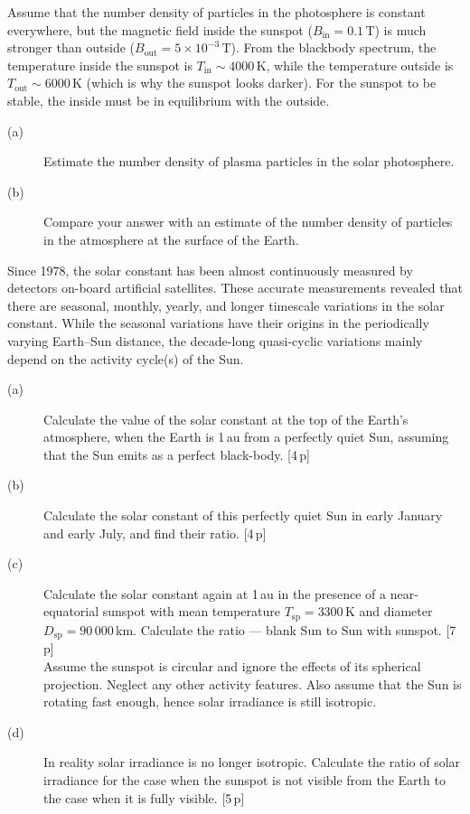 Assume that the number density of particles in the photosphere is constant
everywhere, but the magnetic field inside the sunspot
($B_{\mathrm{in}} = 0.1$\,T) is much stronger than outside
($B_{\mathrm{out}} = 5 \times 10^{-3}$\,T). From the blackbody spectrum, the
temperature inside the sunspot is $T_{\mathrm{in}} \sim 4000$\,K, while the
temperature outside is $T_{\mathrm{out}} \sim 6000$\,K (which is why the sunspot
looks darker). For the sunspot to be stable, the inside must be in equilibrium
with the outside.

\begin{description}
\item[(a)] Estimate the number density of plasma particles in the solar
  photosphere.
\item[(b)] Compare your answer with an estimate of the number density of
  particles in the atmosphere at the surface of the Earth.
\end{description}

Since 1978, the solar constant has been almost continuously measured by
detectors on-board artificial satellites. These accurate measurements revealed
that there are seasonal, monthly, yearly, and longer timescale variations in the
solar constant. While the seasonal variations have their origins in the
periodically varying Earth--Sun distance, the decade-long quasi-cyclic
variations mainly depend on the activity cycle(s) of the Sun.

\begin{description}
\item[(a)] Calculate the value of the solar constant at the top of the Earth's
  atmosphere, when the Earth is 1\,au from a perfectly quiet Sun, assuming that
  the Sun emits as a perfect black-body. \hfill[4\,p]
\item[(b)] Calculate the solar constant of this perfectly quiet Sun in early
  January and early July, and find their ratio. \hfill[4\,p]
\item[(c)] Calculate the solar constant again at 1\,au in the presence of a
  near-equatorial sunspot with mean temperature $T_{\mathrm{sp}} = 3300$\,K and
  diameter $D_{\mathrm{sp}} = 90\,000$\,km. Calculate the ratio --- blank Sun to
  Sun with sunspot. \hfill[7\,p]\\
  Assume the sunspot is circular and ignore the effects of its spherical
  projection. Neglect any other activity features. Also assume that the Sun is
  rotating fast enough, hence solar irradiance is still isotropic.
\item[(d)] In reality solar irradiance is no longer isotropic. Calculate the
  ratio of solar irradiance for the case when the sunspot is not visible from
  the Earth to the case when it is fully visible. \hfill[5\,p]
\end{description}

